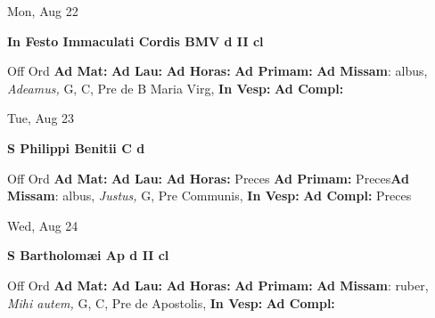 \documentclass[10pt]{memoir}
\begin{document}
\begin{center}
\begin{minipage}{3.5in}
\vspace{2em}
\begin{center}Mon, Aug 22
\end{center}
\textbf{ \large In Festo Immaculati Cordis BMV
\textnormal{\normalsize d II cl}}

\begin{justify}Off Ord
\textbf{Ad Mat: }
\textbf{Ad Lau: }
\textbf{Ad Horas: }
\textbf{Ad Primam: }\textbf{Ad Missam}: albus, \textit{Adeamus,} G, C, Pre de B Maria Virg, 
\textbf{In Vesp: }
\textbf{Ad Compl: }
\end{justify}
\end{minipage}
\end{center}

\begin{center}
\begin{minipage}{3.5in}
\vspace{2em}
\begin{center}Tue, Aug 23
\end{center}
\textbf{ \large S Philippi Benitii C
\textnormal{\normalsize d}}

\begin{justify}Off Ord
\textbf{Ad Mat: }
\textbf{Ad Lau: }
\textbf{Ad Horas: }Preces
\textbf{Ad Primam: }Preces\textbf{Ad Missam}: albus, \textit{Justus,} G, Pre Communis, 
\textbf{In Vesp: }
\textbf{Ad Compl: }Preces
\end{justify}
\end{minipage}
\end{center}

\begin{center}
\begin{minipage}{3.5in}
\vspace{2em}
\begin{center}Wed, Aug 24
\end{center}
\textbf{ \large S Bartholomæi Ap
\textnormal{\normalsize d II cl}}

\begin{justify}Off Ord
\textbf{Ad Mat: }
\textbf{Ad Lau: }
\textbf{Ad Horas: }
\textbf{Ad Primam: }\textbf{Ad Missam}: ruber, \textit{Mihi autem,} G, C, Pre de Apostolis, 
\textbf{In Vesp: }
\textbf{Ad Compl: }
\end{justify}
\end{minipage}
\end{center}
\end{document}
